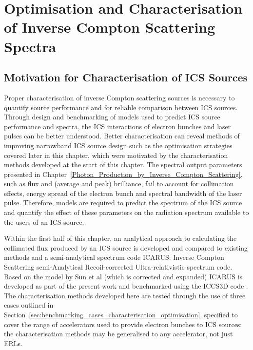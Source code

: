 \documentclass[../main.tex]{subfiles}
\begin{document}
\chapter{Optimisation and Characterisation of Inverse Compton Scattering Spectra}
\label{Optimisation_and_Characterisation_of_Inverse_Compton Scattering_Spectra} %

\section{Motivation for Characterisation of ICS Sources}

Proper characterisation of inverse Compton scattering sources is necessary to quantify source performance and for reliable comparison between ICS sources. Through design and benchmarking of models used to predict ICS source performance and spectra, the ICS interactions of electron bunches and laser pulses can be better understood. Better characterisation can reveal methods of improving narrowband ICS source design such as the optimisation strategies covered later in this chapter, which were motivated by the characterisation methods developed at the start of this chapter. The spectral output parameters presented in Chapter~\ref{Photon_Production_by_Inverse_Compton_Scattering}, such as flux and (average and peak) brilliance, fail to account for collimation effects, energy spread of the electron bunch and spectral bandwidth of the laser pulse. Therefore, models are required to predict the spectrum of the ICS source and quantify the effect of these parameters on the radiation spectrum available to the users of an ICS source. 

Within the first half of this chapter, an analytical approach to calculating the collimated flux produced by an ICS source is developed and compared to existing methods \cite{curatolo2017analytical} and a semi-analytical spectrum code \textsc{ICARUS}: Inverse Compton Scattering semi-Analytical Recoil-corrected Ultra-relativistic spectrum code. Based on the model by Sun et al \cite{sun2009characterizations,sun2011theoretical} (which is corrected and expanded) \textsc{ICARUS} is developed as part of the present work and benchmarked using the \textsc{ICCS3D} code \cite{krafft2016laser,ranjan2018simulation}. The characterisation methods developed here are tested through the use of three cases outlined in Section~\ref{sec:benchmarking_cases_characterisation_optimisation}, specified to cover the range of accelerators used to provide electron bunches to ICS sources; the characterisation methods may be generalised to any accelerator, not just ERLs.
\end{document}

